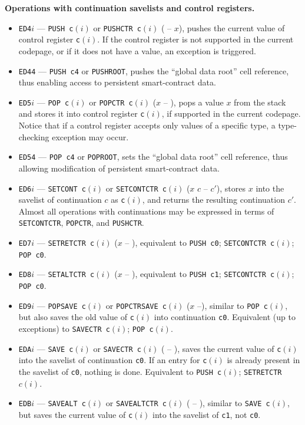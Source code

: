 \documentclass[12pt,oneside]{article}
\def\makepoint#1{\medbreak\noindent{\bf #1.\ }}
\def\nxsubpoint{\refstepcounter{subsubsection}%
  \smallbreak\makepoint{\thesubsubsection}}
\def\emb#1{\textbf{#1.}}
\begin{document}
\nxsubpoint\emb{Operations with continuation savelists and control registers}
\begin{itemize}
\item {\tt ED4$i$} --- {\tt PUSH c$(i)$} or {\tt PUSHCTR c$(i)$} ( -- $x$), pushes the current value of control register {\tt c$(i)$}. If the control register is not supported in the current codepage, or if it does not have a value, an exception is triggered.
\item {\tt ED44} --- {\tt PUSH c4} or {\tt PUSHROOT}, pushes the ``global data root'' cell reference, thus enabling access to persistent smart-contract data.
\item {\tt ED5$i$} --- {\tt POP c$(i)$} or {\tt POPCTR c$(i)$} ($x$ -- ), pops a value $x$ from the stack and stores it into control register {\tt c$(i)$}, if supported in the current codepage. Notice that if a control register accepts only values of a specific type, a type-checking exception may occur.
\item {\tt ED54} --- {\tt POP c4} or {\tt POPROOT}, sets the ``global data root'' cell reference, thus allowing modification of persistent smart-contract data.
\item {\tt ED6$i$} --- {\tt SETCONT c$(i)$} or {\tt SETCONTCTR c$(i)$} ($x$ $c$ -- $c'$), stores $x$ into the savelist of continuation $c$ as {\tt c$(i)$}, and returns the resulting continuation $c'$. Almost all operations with continuations may be expressed in terms of {\tt SETCONTCTR}, {\tt POPCTR}, and {\tt PUSHCTR}.
\item {\tt ED7$i$} --- {\tt SETRETCTR c$(i)$} ($x$ -- ), equivalent to {\tt PUSH c0}; {\tt SETCONTCTR c$(i)$}; {\tt POP c0}.
\item {\tt ED8$i$} --- {\tt SETALTCTR c$(i)$} ($x$ -- ), equivalent to {\tt PUSH c1}; {\tt SETCONTCTR c$(i)$}; {\tt POP c0}.
\item {\tt ED9$i$} --- {\tt POPSAVE c$(i)$} or {\tt POPCTRSAVE c$(i)$} ($x$ --), similar to {\tt POP c$(i)$}, but also saves the old value of {\tt c$(i)$} into continuation {\tt c0}. Equivalent (up to exceptions) to {\tt SAVECTR c$(i)$}; {\tt POP c$(i)$}.
\item {\tt EDA$i$} --- {\tt SAVE c$(i)$} or {\tt SAVECTR c$(i)$} ( -- ), saves the current value of {\tt c$(i)$} into the savelist of continuation {\tt c0}. If an entry for {\tt c$(i)$} is already present in the savelist of {\tt c0}, nothing is done. Equivalent to {\tt PUSH c$(i)$}; {\tt SETRETCTR $c(i)$}.
\item {\tt EDB$i$} --- {\tt SAVEALT c$(i)$} or {\tt SAVEALTCTR c$(i)$} ( -- ), similar to {\tt SAVE c$(i)$}, but saves the current value of {\tt c$(i)$} into the savelist of {\tt c1}, not {\tt c0}.

\end{itemize}
\end{document}
